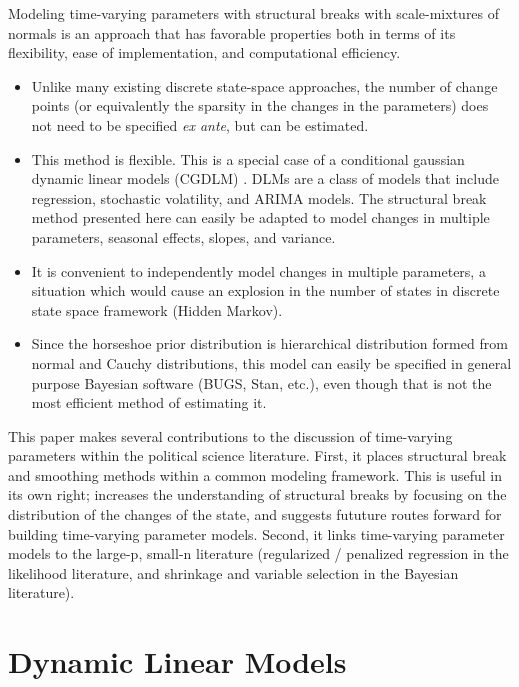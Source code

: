 \documentclass{article}
\begin{document}
Modeling time-varying parameters with structural breaks with scale-mixtures of normals is an approach that has favorable properties both in terms of its flexibility, ease of implementation, and computational efficiency.
\begin{itemize}
\item Unlike many existing discrete state-space approaches, the number of change points (or equivalently the sparsity in the changes in the parameters) does not need to be specified \textit{ex ante}, but can be estimated.
\item This method is flexible.
  This is a special case of a conditional gaussian dynamic linear models (CGDLM) \parencites{WestHarrison1997}{DurbinKoopman2001}{CommandeurKoopman2007}{ShumwayStoffer2010}.
  DLMs are a class of models that include regression, stochastic volatility, and ARIMA models.
  The structural break method presented here can easily be adapted to model changes in multiple parameters, seasonal effects, slopes, and variance.
\item It is convenient to independently model changes in multiple parameters, a situation which would cause an explosion in the number of states in discrete state space framework (Hidden Markov).
\item Since the horseshoe prior distribution is hierarchical distribution formed from normal and Cauchy distributions, this model can easily be specified in general purpose Bayesian software (BUGS, Stan, etc.), even though that is not the most efficient method of estimating it.
\end{itemize}

This paper makes several contributions to the discussion of time-varying parameters within the political science literature.
First, it places structural break and smoothing methods within a common modeling framework.
This is useful in its own right; increases the understanding of structural breaks by focusing on the distribution of the changes of the state, and suggests fututure routes forward for building time-varying parameter models.
Second, it links time-varying parameter models to the large-p, small-n literature (regularized / penalized regression in the likelihood literature, and shrinkage and variable selection in the Bayesian literature). 

\section{Dynamic Linear Models}
\end{document}
